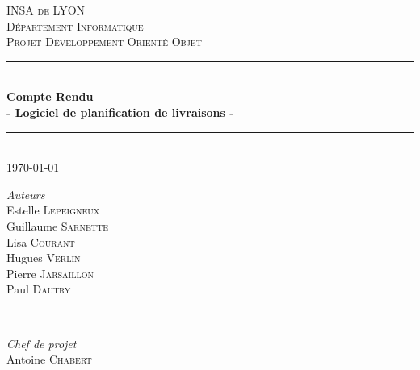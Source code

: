 \documentclass[12pt]{article}
\begin{document}
\begin{titlepage}

\newcommand{\HRule}{\rule{\linewidth}{0.5mm}} %

\center %
 

\vspace*{1cm}

\textsc{\LARGE INSA de LYON}\\[1.5cm] 
\textsc{\Large D\'epartement Informatique}\\[0.5cm] 
\textsc{\large Projet Développement Orienté Objet}\\[0.5cm] %


\HRule \\[0.4cm]
{ \huge \bfseries Compte Rendu}\\[0.1cm]
{\large \bfseries - Logiciel de planification de livraisons -} 
\HRule \\[1.5cm]
 

{\large \today}\\[2cm] %
 

\begin{minipage}{0.4\textwidth}
\begin{center} \large
\emph{Auteurs} \\
Estelle \textsc{Lepeigneux} \\
Guillaume \textsc{Sarnette} \\
Lisa \textsc{Courant} \\
Hugues \textsc{Verlin} \\
Pierre \textsc{Jarsaillon} \\
Paul \textsc{Dautry} \\
\end{center}
\end{minipage}
~
\begin{minipage}{0.4\textwidth}
\begin{center} \large
\emph{Chef de projet} \\
Antoine \textsc{Chabert}
\end{center}
\end{minipage}\\[5cm]


\end{titlepage}
\end{document}
